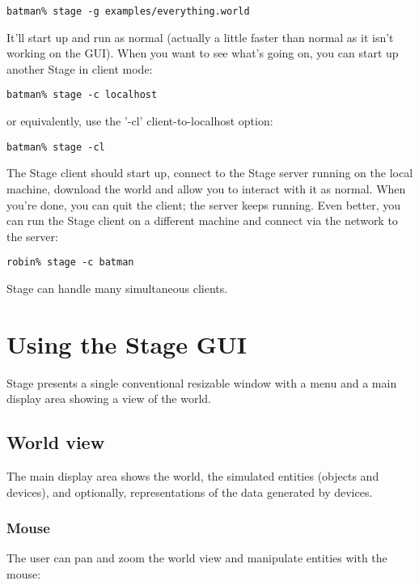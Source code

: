 \documentclass[11pt]{report}
\begin{document}
\begin{verbatim}
batman% stage -g examples/everything.world 
\end{verbatim}

It'll start up and run as normal (actually a little faster than normal
as it isn't working on the GUI). When you want to see what's going on, you can start up another Stage in client mode:

\begin{verbatim}
batman% stage -c localhost
\end{verbatim}

or equivalently, use the '-cl' client-to-localhost option:

\begin{verbatim}
batman% stage -cl
\end{verbatim}

The Stage client should start up, connect to the Stage server running
on the local machine, download the world and allow you to interact
with it as normal. When you're done, you can quit the client; the
server keeps running. Even better, you can run the Stage client on a
different machine and connect via the network to the server:

\begin{verbatim}
robin% stage -c batman
\end{verbatim}

Stage can handle many simultaneous clients.

\chapter{Using the Stage GUI}

Stage presents a single conventional resizable window with a menu and
a main display area showing a view of the world.

\section{World view}
The main display area shows the world, the simulated entities (objects
and devices), and optionally, representations of the data generated
by devices. 

\subsection{Mouse}
The user can pan and zoom the world view and manipulate entities with
the mouse:
\end{document}
